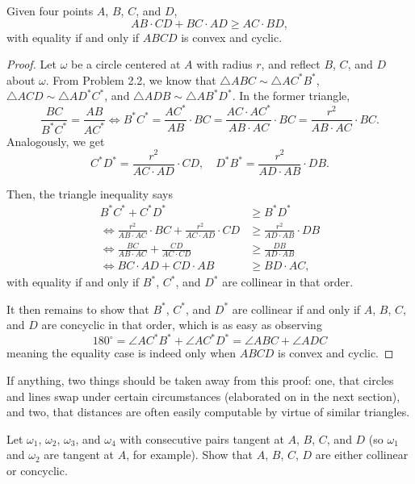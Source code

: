 \documentclass{scrartcl}
\providecommand{\dg}{^\circ}
\begin{document}
\begin{problem}
	Given four points $A$, $B$, $C$, and $D$,
	\[AB\cdot CD + BC\cdot AD \ge AC\cdot BD,\]
	with equality if and only if $ABCD$ is convex and cyclic.
\end{problem}
\begin{proof}
	Let $\omega$ be a circle centered at $A$ with radius $r$,
	and reflect $B$, $C$, and $D$ about $\omega$.
	From Problem 2.2, we know that
	$\triangle ABC\sim\triangle AC^\ast B^\ast$,
	$\triangle ACD\sim\triangle AD^\ast C^\ast$, and
	$\triangle ADB\sim\triangle AB^\ast D^\ast$.
	In the former triangle,
	\[\frac{BC}{B^\ast C^\ast} = \frac{AB}{AC^\ast}
	\iff B^\ast C^\ast = \frac{AC^\ast}{AB}\cdot BC =
	\frac{AC\cdot AC^\ast}{AB\cdot AC}\cdot BC =
	\frac{r^2}{AB\cdot AC}\cdot BC.\]
	Analogously, we get
	\[C^\ast D^\ast = \frac{r^2}{AC\cdot AD}\cdot CD,\quad
	D^\ast B^\ast = \frac{r^2}{AD\cdot AB}\cdot DB.\]
	
	Then, the triangle inequality says
	\begin{align*}
		B^\ast C^\ast + C^\ast D^\ast &\ge B^\ast D^\ast\\
		\iff\frac{r^2}{AB\cdot AC}\cdot BC +
		\frac{r^2}{AC\cdot AD}\cdot CD &\ge
		\frac{r^2}{AD\cdot AB}\cdot DB\\
		\iff \frac{BC}{AB\cdot AC} + \frac{CD}{AC\cdot CD} &\ge
		\frac{DB}{AD\cdot AB}\\
		\iff BC\cdot AD + CD\cdot AB &\ge BD\cdot AC,
	\end{align*}
	with equality if and only if $B^\ast$, $C^\ast$, and $D^\ast$
	are collinear in that order.
	
	It then remains to show that $B^\ast$, $C^\ast$, and $D^\ast$
	are collinear if and only if $A$, $B$, $C$, and $D$ are concyclic
	in that order, which is as easy as observing
	\[180\dg = \angle AC^\ast B^\ast + \angle AC^\ast D^\ast =
	\angle ABC + \angle ADC\]
	meaning the equality case is indeed only when $ABCD$ is
	convex and cyclic.
\end{proof}

If anything, two things should be taken away from this proof:
one, that circles and lines swap under certain circumstances
(elaborated on in the next section), and two, that distances are often
easily computable by virtue of similar triangles.

\begin{problem}
	Let $\omega_1$, $\omega_2$, $\omega_3$, and $\omega_4$
	with consecutive pairs tangent at $A$, $B$, $C$, and $D$
	(so $\omega_1$ and $\omega_2$ are tangent at $A$, for example).
	Show that $A$, $B$, $C$, $D$ are either collinear or concyclic.
\end{problem}
\end{document}
